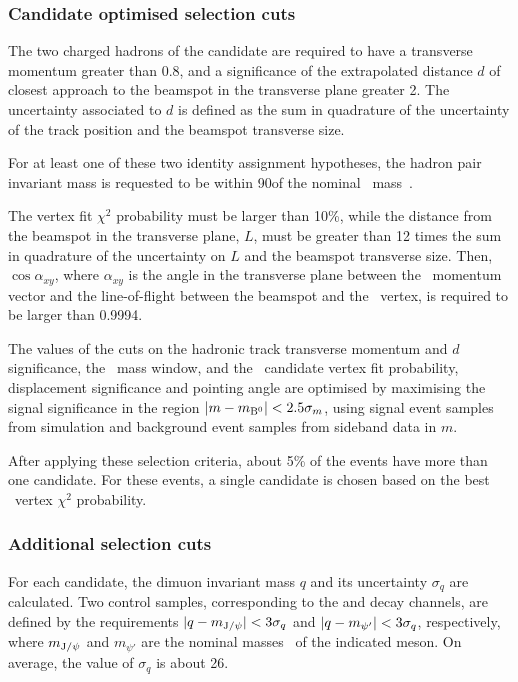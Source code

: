 \subsubsection{Candidate optimised selection cuts}

The two charged hadrons of the candidate are required to have a transverse momentum greater than 0.8\GeV, and a significance of the extrapolated distance $d$ of closest approach to the beamspot in the transverse plane greater 2.
The uncertainty associated to $d$ is defined as the sum in quadrature of the uncertainty of the track position and the beamspot transverse size.

For at least one of these two identity assignment hypotheses, the hadron pair invariant mass is requested to be within 90\MeV of the nominal \cPKstz\ mass~\cite{PDG}.

The \PBz vertex fit $\chi^2$ probability must be larger than 10\%, while the distance from the beamspot in the transverse plane, $L$, must be greater than 12 times the sum in quadrature of the uncertainty on $L$ and the beamspot transverse size.
Then, $\cos{\alpha_{xy}}$, where $\alpha_{xy}$ is the angle in the transverse plane between the \PBz\ momentum vector and the line-of-flight between the beamspot and the \PBz\ vertex, is required to be larger than 0.9994.

The values of the cuts on the hadronic track transverse momentum and $d$ significance, the \cPKstz\ mass window, and the \PBz\ candidate vertex fit probability, displacement significance and pointing angle are optimised by maximising the signal significance in the region $\lvert m-m_{{\textrm{B}}{}^{0}}\rvert < 2.5\sigma_m$, using signal event samples from simulation and background event samples from sideband data in $m$.

After applying these selection criteria, about 5\% of the events have more than one candidate.
For these events, a single candidate is chosen based on the best \PBz\ vertex $\chi^2$ probability.

\subsubsection{Additional selection cuts}

For each candidate, the dimuon invariant mass $q$ and its uncertainty $\sigma_{q}$ are calculated.
Two control samples, corresponding to the \BtoKstJpsi and \BtoKstpsip decay channels, are defined by the requirements $\lvert q - m_{\textrm{J}/\psi}\rvert < 3\sigma_{q}$ and $\lvert q - m_{\psi'}\rvert < 3\sigma_{q}$, respectively, where $m_{\textrm{J}/\psi}$ and $m_{\psi'}$ are the nominal masses~\cite{PDG} of the indicated meson.
On average, the value of $\sigma_{q}$ is about 26\MeV.

